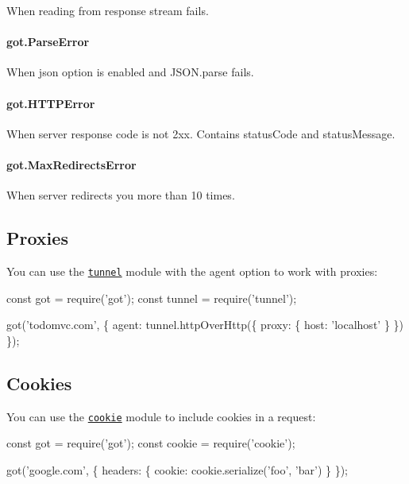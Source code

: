 When reading from response stream fails.

\paragraph*{got.\+Parse\+Error}

When {\ttfamily json} option is enabled and {\ttfamily J\+S\+O\+N.\+parse} fails.

\paragraph*{got.\+H\+T\+T\+P\+Error}

When server response code is not 2xx. Contains {\ttfamily status\+Code} and {\ttfamily status\+Message}.

\paragraph*{got.\+Max\+Redirects\+Error}

When server redirects you more than 10 times.

\subsection*{Proxies}

You can use the \href{https://github.com/koichik/node-tunnel}{\tt {\ttfamily tunnel}} module with the {\ttfamily agent} option to work with proxies\+:


\begin{DoxyCode}
const got = require('got');
const tunnel = require('tunnel');

got('todomvc.com', \{
  agent: tunnel.httpOverHttp(\{
    proxy: \{
      host: 'localhost'
    \}
  \})
\});
\end{DoxyCode}


\subsection*{Cookies}

You can use the \href{https://github.com/jshttp/cookie}{\tt {\ttfamily cookie}} module to include cookies in a request\+:


\begin{DoxyCode}
const got = require('got');
const cookie = require('cookie');

got('google.com', \{
  headers: \{
    cookie: cookie.serialize('foo', 'bar')
  \}
\});
\end{DoxyCode}


